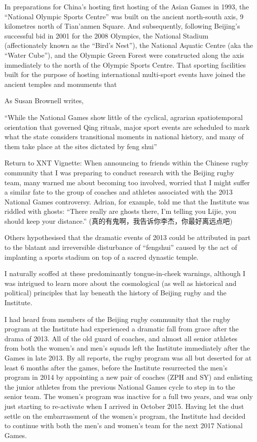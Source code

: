 In preparations for China's hosting first hosting of the Asian Games in 1993, the ``National Olympic Sports Centre''  was built on the ancient north-south axis, 9 kilometres north of Tian'anmen Square. And subsequently, following Beijing's successful bid in 2001 for the 2008 Olympics, the National Stadium (affectionately known as the ``Bird's Nest''), the National Aquatic Centre (aka the ``Water Cube''), and the Olympic Green Forest were constructed along the axis immediately to the north of the Olympic Sports Centre.  That sporting facilities built for the purpose of hosting international multi-sport events have joined the ancient temples and monuments that

As Susan Brownell writes,

``While the National Games show little of the cyclical, agrarian spatiotemporal orientation that governed Qing rituals, major sport events are scheduled to mark what the state considers transitional moments in national history, and many of them take place at the sites dictated by feng shui'' \citep[88]{Brownel2008}





Return to XNT Vignette:
When announcing to friends within the Chinese rugby community that I was preparing to conduct research with the Beijing rugby team, many warned me about becoming too involved, worried that I might suffer a similar fate to the group of coaches and athletes associated with the 2013 National Games controversy.  Adrian, for example, told me that the Institute was riddled with ghosts: ``There really are ghosts there, I'm telling you Lijie, you should keep your distance.'' (真的有鬼啊，我告诉你李杰，你最好离远点吧)

  Others hypothesised that the dramatic events of 2013 could be attributed in part to the blatant and irreversible disturbance of ``fengshui'' caused by the act of implanting a sports stadium on top of a sacred dynastic temple.

I naturally scoffed at these predominantly tongue-in-cheek warnings, although I was intrigued to learn more about the cosmological (as well as historical and political) principles that lay beneath the history of Beijing rugby and the Institute.

I had heard from members of the Beijing rugby community that the rugby program at the Institute had experienced a dramatic fall from grace after the drama of 2013.  All of the old guard of coaches, and almost all senior athletes from both the women's and men's squads left the Institute immediately after the Games in late 2013.  By all reports, the rugby program was all but deserted for at least 6 months after the games, before the Institute resurrected the men's program in 2014 by appointing a new pair of coaches (ZPH and SY) and enlisting the junior athletes from the previous National Games cycle to step in to the senior team.  The women's program was inactive for a full two years, and was only just starting to re-activate when I arrived in October 2015.  Having let the dust settle on the embarrassment of the women's program, the Institute had decided to continue with both the men's and women's team for the next 2017 National Games.


